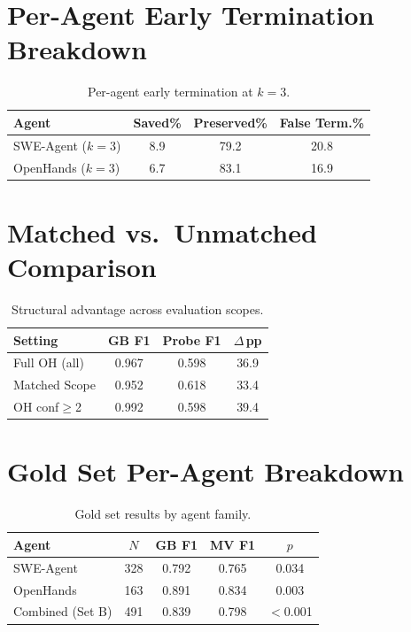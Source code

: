 \documentclass[11pt,a4paper]{article}
\begin{document}
\clearpage
\appendix

\section{Per-Agent Early Termination Breakdown}
\label{app:per-agent-term}

\begin{table}[h]
\centering
\small
\begin{tabular}{lccc}
\toprule
\textbf{Agent} & \textbf{Saved\%} & \textbf{Preserved\%} & \textbf{False Term.\%} \\
\midrule
SWE-Agent ($k{=}3$) & 8.9 & 79.2 & 20.8 \\
OpenHands ($k{=}3$) & 6.7 & 83.1 & 16.9 \\
\bottomrule
\end{tabular}
\caption{Per-agent early termination at $k{=}3$.}
\label{tab:per-agent-term}
\end{table}

\section{Matched vs.\ Unmatched Comparison}
\label{app:matched-unmatched}

\begin{table}[h]
\centering
\small
\begin{tabular}{lccc}
\toprule
\textbf{Setting} & \textbf{GB F1} & \textbf{Probe F1} & \textbf{$\Delta$\,pp} \\
\midrule
Full OH (all) & 0.967 & 0.598 & 36.9 \\
Matched Scope & 0.952 & 0.618 & 33.4 \\
OH conf$\geq$2 & 0.992 & 0.598 & 39.4 \\
\bottomrule
\end{tabular}
\caption{Structural advantage across evaluation scopes.}
\label{tab:matched-unmatched}
\end{table}

\section{Gold Set Per-Agent Breakdown}
\label{app:gold-per-agent}

\begin{table}[h]
\centering
\small
\begin{tabular}{lcccc}
\toprule
\textbf{Agent} & \textbf{$N$} & \textbf{GB F1} & \textbf{MV F1} & \textbf{$p$} \\
\midrule
SWE-Agent & 328 & 0.792 & 0.765 & 0.034 \\
OpenHands & 163 & 0.891 & 0.834 & 0.003 \\
Combined (Set B) & 491 & 0.839 & 0.798 & $<$0.001 \\
\bottomrule
\end{tabular}
\caption{Gold set results by agent family.}
\label{tab:gold-per-agent}
\end{table}
\end{document}
